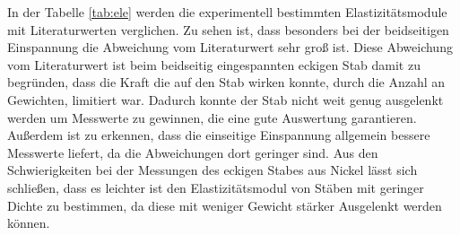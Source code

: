 In der Tabelle \ref{tab:ele} werden die experimentell bestimmten Elastizitätsmodule mit Literaturwerten verglichen.
Zu sehen ist, dass besonders bei der beidseitigen Einspannung die Abweichung vom Literaturwert sehr groß ist.
Diese Abweichung vom Literaturwert ist beim beidseitig eingespannten eckigen Stab damit zu begründen, dass die Kraft die auf den Stab wirken konnte, durch die Anzahl an Gewichten, limitiert war.
Dadurch konnte der Stab nicht weit genug ausgelenkt werden um Messwerte zu gewinnen, die eine gute Auswertung garantieren.\\
Außerdem ist zu erkennen, dass die einseitige Einspannung allgemein bessere Messwerte liefert, da die Abweichungen dort geringer sind.
Aus den Schwierigkeiten bei der Messungen des eckigen Stabes aus Nickel lässt sich schließen, dass es leichter ist den Elastizitätsmodul von Stäben mit geringer Dichte zu bestimmen, da diese mit weniger Gewicht stärker Ausgelenkt werden können.